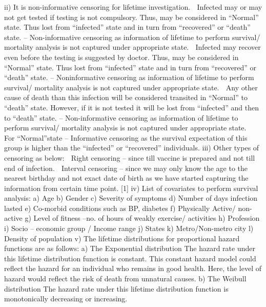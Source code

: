 \documentclass[a4paper,12pt]{article}
\begin{document}
ii)
It is non-informative censoring for lifetime investigation.
 Infected may or may not get tested if testing is not compulsory. Thus, may be considered in “Normal”
state. Thus lost from “infected” state and in turn from “recovered” or “death” state. – Non-informative
censoring as information of lifetime to perform survival/ mortality analysis is not captured under
appropriate state.
 Infected may recover even before the testing is suggested by doctor. Thus, may be considered in
“Normal” state. Thus lost from “infected” state and in turn from “recovered” or “death” state. – Noninformative
censoring as information of lifetime to perform survival/ mortality analysis is not captured
under appropriate state.
 Any other cause of death than this infection will be considered transited in “Normal” to “death” state.
However, if it is not tested it will be lost from “infected” and then to “death” state. – Non-informative
censoring as information of lifetime to perform survival/ mortality analysis is not captured under
appropriate state.
 For “Normal”state – Informative censoring as the survival expectation of this group is higher than the
“infected” or “recovered” individuals.
iii)
Other types of censoring as below:
 Right censoring – since till vaccine is prepared and not till end of infection. 
 Interval censoring – since we may only know the age to the nearest birthday and not exact date of birth
as we have started capturing the information from certain time point. 
[1]
iv)
List of covariates to perform survival analysis:
a) Age
b) Gender
c) Severity of symptoms
d) Number of days infection lasted
e) Co-morbid conditions such as BP, diabetes
f) Physically Active/ non-active
g) Level of fitness –no. of hours of weakly exercise/ activities
h) Profession
i) Socio – economic group / Income range
j) States
k) Metro/Non-metro city
l) Density of population
v)
The lifetime distributions for proportional hazard functions are as follows:
a) The Exponential distribution 
The hazard rate under this lifetime distribution function is constant. 
This constant hazard model could reflect the hazard for an individual who remains in good health.
Here, the level of hazard would reflect the risk of death from unnatural causes. 
b) The Weibull distribution 
The hazard rate under this lifetime distribution function is monotonically decreasing or increasing.
\end{document}
